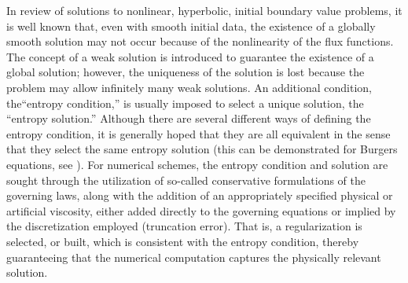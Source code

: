 \documentclass[preprint,10pt]{elsarticle}
\begin{document}
In review of solutions to nonlinear, hyperbolic, initial boundary value problems, it is well known that, even with smooth initial data, the existence of a 
globally smooth solution may not occur because of the nonlinearity of the flux functions. The concept of a weak
solution is introduced to guarantee the existence of a global solution; however, the uniqueness of the solution is lost because the problem may
allow infinitely many weak solutions.  An additional condition, the``entropy condition,'' is usually imposed to select a
unique solution, the ``entropy solution.'' %
Although there are several different ways of defining the entropy condition, it is generally hoped that they are all equivalent in the sense 
that they select the same entropy solution (this can be demonstrated for Burgers equations, see \cite{Evans1998,Lellis_minimalentropy}).
For numerical schemes, the entropy condition and solution are sought through the utilization of so-called conservative formulations of the 
governing laws, along with the addition of an appropriately specified physical or artificial viscosity, either added directly to the governing 
equations or implied by the discretization employed (truncation error).  That is, a regularization is selected, or built, which is consistent with the 
entropy condition, thereby guaranteeing that the numerical computation captures the physically relevant solution.  
\end{document}
